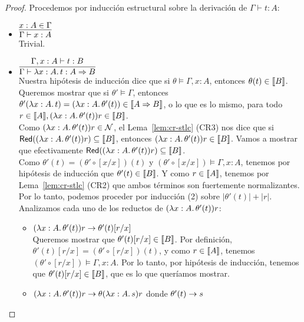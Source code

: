 \begin{proof}
  Procedemos por inducción estructural sobre la derivación de \( \Gamma \vdash t : A \):
  \begin{itemize}
    \item \( \infer{\Gamma \vdash x : A}{x : A \in \Gamma} \)
      \\ Trivial.
    \item \( \infer{\Gamma \vdash \abstr{x : A}{t} : A \Rightarrow B}{\Gamma, x : A \vdash t : B} \)
      \\ Nuestra hipótesis de inducción dice que si \( \theta \models \Gamma, x : A \), entonces \( \theta(t) \in \llbracket B\rrbracket \).
      Queremos mostrar que si \( \theta' \models \Gamma \), entonces \( \theta'(\lambda x : A\ldotp t) = (\lambda x : A\ldotp\theta'(t)) \in \llbracket A \Rightarrow B\rrbracket \), o lo que es lo mismo, para todo \( r \in \llbracket A\rrbracket, (\lambda x : A\ldotp\theta'(t)) r \in \llbracket B\rrbracket \).
      \\ Como \( (\lambda x : A\ldotp\theta'(t)) r \in \mathcal{N} \), el Lema~\ref{lem:cr-stlc} (CR3) nos dice que si \( \mathsf{Red} ((\lambda x : A\ldotp\theta'(t)) r) \subseteq \llbracket B\rrbracket \), entonces \( (\lambda x : A\ldotp\theta'(t)) r \in \llbracket B\rrbracket \). Vamos a mostrar que efectivamente \( \mathsf{Red} ((\lambda x : A\ldotp\theta'(t)) r) \subseteq \llbracket B\rrbracket \).
      \\ Como \( \theta'(t) = (\theta' \circ [x/x])(t) \) y \( (\theta' \circ [x/x]) \models \Gamma, x : A \), tenemos por hipótesis de inducción que \( \theta'(t) \in \llbracket B\rrbracket \). Y como \( r \in \llbracket A\rrbracket \), tenemos por Lema~\ref{lem:cr-stlc} (CR2) que ambos términos son fuertemente normalizantes. Por lo tanto, podemos proceder por inducción (2) sobre \( |\theta'(t)| + |r| \). Analizamos cada uno de los reductos de \( (\lambda x : A\ldotp\theta'(t)) r \):
      \begin{itemize}
        \item \( (\lambda x : A\ldotp\theta'(t)) r \rightarrow \theta'(t)[r/x] \)
        \\ Queremos mostrar que \( \theta'(t)[r/x] \in \llbracket B\rrbracket \). Por definición, \( \theta'(t)[r/x] = (\theta' \circ [r/x])(t) \), y como \( r \in \llbracket A\rrbracket \), tenemos \( (\theta' \circ [r/x]) \models \Gamma, x:A \). Por lo tanto, por hipótesis de inducción, tenemos que \( \theta'(t)[r/x] \in \llbracket B\rrbracket \), que es lo que queríamos mostrar.
        \item \( (\lambda x : A\ldotp\theta'(t)) r \rightarrow \theta(\lambda x : A\ldotp s) r \) donde \( \theta'(t) \rightarrow s \)

\end{itemize}
\end{itemize}
\end{proof}
